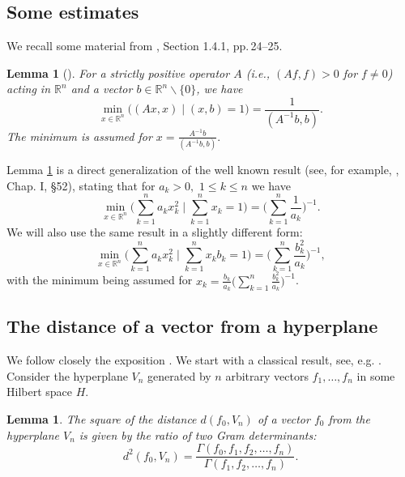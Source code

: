 \documentclass[preprint,12pt]{elsarticle}
\newtheorem{lem}[thm]{Lemma}
\numberwithin{equation}{section}
\begin{document}
\subsection{Some estimates}
\label{s.1.4.1}
We recall some material from \cite{Kos_B_09}, Section 1.4.1, pp.\,24--25.
\begin{lem} [\cite{Kos04}]
\label{1.l.min}
 For a strictly positive operator $A$ {\rm (}i.e., $(Af,f)>0$ for $f\not=0${\rm )} acting in ${\mathbb R}^n$ and a vector
$b\in{\mathbb R}^n\backslash\{0\}$, we have
\begin{equation}
\label{A.min3} \min_{x\in{\mathbb R}^n}\Big((Ax,x)\mid
(x,b)=1\Big)=
\frac{1}{(A^{-1}b,b)}.
\end{equation}
The minimum is assumed  for
$x=\frac{A^{-1}b}{(A^{-1}b,b)}.
$
\end{lem}
%
Lemma \ref{1.l.min} is a direct generalization of the well known
result (see, for example, \cite{BecBel61}, Chap. I, \S 52), 
stating that
%
for $a_k>0,\,\,1\leq k \leq n$ we have
\begin{equation}
\label{A.min1}
 \min_{x\in{\mathbb
R}^n}\Big(\sum_{k=1}^na_kx_k^2\mid \sum_{k=1}^n x_k=1\Big)=
\Big(\sum_{k=1}^n \frac{1}{a_k}\Big)^{-1}.
\end{equation}
We will also use  the same result   in a slightly different
form:
\begin{equation}
\label{A.min2}
 \min_{x\in{\mathbb
R}^n}\Big(\sum_{k=1}^na_kx_k^2\mid \sum_{k=1}^n x_kb_k=1\Big)=
\Big(\sum_{k=1}^n \frac{b_k^2}{a_k}\Big)^{-1},
\end{equation}
%
with the minimum being assumed 
for
$x_k=\frac{b_k}{a_k}\Big(\sum_{k=1}^n\frac{b_k^2}{a_k}\Big)^{-1}$.
%
\subsection{The distance of a vector from a hyperplane}
We follow closely the exposition  \cite{Kos-hpl-arx20}. We start with a classical result, see, e.g. 
\cite{Gan58}.
Consider the hyperplane $V_n$ generated by $n$ arbitrary vectors $f_1,\dots, f_{n}$ in some Hilbert space  $H$. 
\begin{lem} 
\label{l.d(f,v_n)}
The square of the distance $d(f_0,V_n)$ of a vector $f_0$ from the hyperplane $V_n$ is given by the ratio of two Gram determinants: 
\begin{equation}
\label{d(f,v_n)}
d^2(f_0,V_n)=
\frac{\Gamma(f_0,f_1,f_2,\dots, f_n)}{\Gamma(f_1,f_2,\dots, f_n)}.
\end{equation}
\end{lem}
\end{document}
